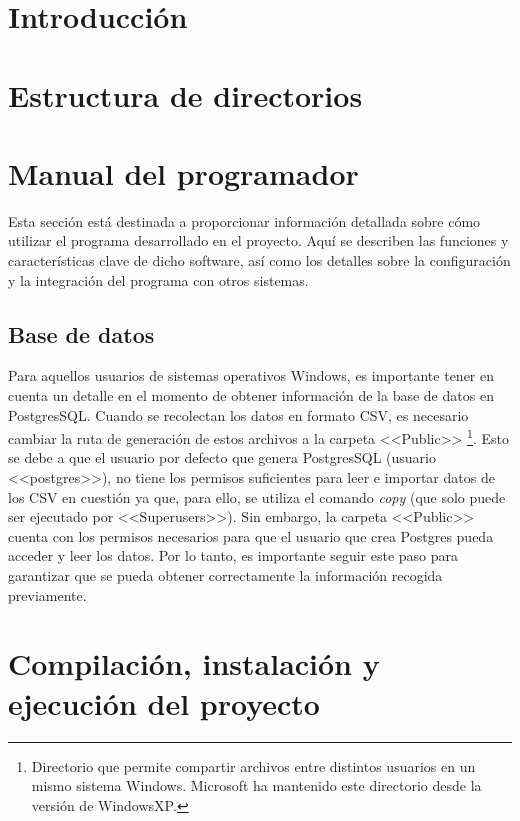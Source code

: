 
\section{Introducción}



\section{Estructura de directorios}

\section{Manual del programador}

Esta sección está destinada a proporcionar información detallada sobre cómo utilizar el programa desarrollado en el proyecto. Aquí se describen las funciones y características clave de dicho software, así como los detalles sobre la configuración y la integración del programa con otros sistemas.

\subsection{Base de datos}
Para aquellos usuarios de sistemas operativos Windows, es importante tener en cuenta un detalle en el momento de obtener información de la base de datos en PostgresSQL. Cuando se recolectan los datos en formato CSV, es necesario cambiar la ruta de generación de estos archivos a la carpeta <<Public>> \footnote{Directorio que permite compartir archivos entre distintos usuarios en un mismo sistema Windows. Microsoft ha mantenido este directorio desde la versión de WindowsXP.}. Esto se debe a que el usuario por defecto que genera PostgresSQL (usuario <<postgres>>), no tiene los permisos suficientes para leer e importar datos de los CSV en cuestión ya que, para ello, se utiliza el comando \textit{copy} (que solo puede ser ejecutado por <<Superusers>>)\cite{Dominguez2020}. Sin embargo, la carpeta <<Public>> cuenta con los permisos necesarios para que el usuario que crea Postgres pueda acceder y leer los datos. Por lo tanto, es importante seguir este paso para garantizar que se pueda obtener correctamente la información recogida previamente.


\section{Compilación, instalación y ejecución del proyecto}

